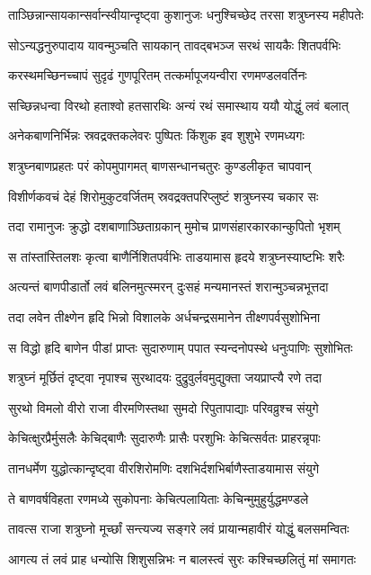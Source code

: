 \twolineshloka
{ताञ्छिन्नान्सायकान्सर्वान्स्वीयान्दृष्ट्वा कुशानुजः}
{धनुश्चिच्छेद तरसा शत्रुघ्नस्य महीपतेः}%

\twolineshloka
{सोऽन्यद्धनुरुपादाय यावन्मुञ्चति सायकान्}
{तावद्बभञ्ज सरथं सायकैः शितपर्वभिः}%

\twolineshloka
{करस्थमच्छिनच्चापं सुदृढं गुणपूरितम्}
{तत्कर्मापूजयन्वीरा रणमण्डलवर्तिनः}%

\twolineshloka
{सच्छिन्नधन्वा विरथो हताश्वो हतसारथिः}
{अन्यं रथं समास्थाय ययौ योद्धुं लवं बलात्}%

\twolineshloka
{अनेकबाणनिर्भिन्नः स्रवद्रक्तकलेवरः}
{पुष्पितः किंशुक इव शुशुभे रणमध्यगः}%

\twolineshloka
{शत्रुघ्नबाणप्रहतः परं कोपमुपागमत्}
{बाणसन्धानचतुरः कुण्डलीकृत चापवान्}%

\twolineshloka
{विशीर्णकवचं देहं शिरोमुकुटवर्जितम्}
{स्रवद्रक्तपरिप्लुष्टं शत्रुघ्नस्य चकार सः}%

\twolineshloka
{तदा रामानुजः क्रुद्धो दशबाणाञ्छिताग्रकान्}
{मुमोच प्राणसंहारकारकान्कुपितो भृशम्}%

\twolineshloka
{स तांस्तांस्तिलशः कृत्वा बाणैर्निशितपर्वभिः}
{ताडयामास हृदये शत्रुघ्नस्याष्टभिः शरैः}%

\twolineshloka
{अत्यन्तं बाणपीडार्तो लवं बलिनमुत्स्मरन्}
{दुःसहं मन्यमानस्तं शरान्मुञ्चन्नभूत्तदा}%

\twolineshloka
{तदा लवेन तीक्ष्णेन हृदि भिन्नो विशालके}
{अर्धचन्द्रसमानेन तीक्ष्णपर्वसुशोभिना}%

\twolineshloka
{स विद्धो हृदि बाणेन पीडां प्राप्तः सुदारुणाम्}
{पपात स्यन्दनोपस्थे धनुःपाणिः सुशोभितः}%

\twolineshloka
{शत्रुघ्नं मूर्छितं दृष्ट्वा नृपाश्च सुरथादयः}
{दुद्रुवुर्लवमुद्युक्ता जयप्राप्त्यै रणे तदा}%

\twolineshloka
{सुरथो विमलो वीरो राजा वीरमणिस्तथा}
{सुमदो रिपुतापाद्याः परिवव्रुश्च संयुगे}%

\twolineshloka
{केचित्क्षुरप्रैर्मुसलैः केचिद्बाणैः सुदारुणैः}
{प्रासैः परशुभिः केचित्सर्वतः प्राहरन्नृपाः}%

\twolineshloka
{तानधर्मेण युद्धोत्कान्दृष्ट्वा वीरशिरोमणिः}
{दशभिर्दशभिर्बाणैस्ताडयामास संयुगे}%

\twolineshloka
{ते बाणवर्षविहता रणमध्ये सुकोपनाः}
{केचित्पलायिताः केचिन्मुमुहुर्युद्धमण्डले}%

\twolineshloka
{तावत्स राजा शत्रुघ्नो मूर्च्छां सन्त्यज्य सङ्गरे}
{लवं प्रायान्महावीरं योद्धुं बलसमन्वितः}%

\twolineshloka
{आगत्य तं लवं प्राह धन्योसि शिशुसन्निभः}
{न बालस्त्वं सुरः कश्चिच्छलितुं मां समागतः}%

